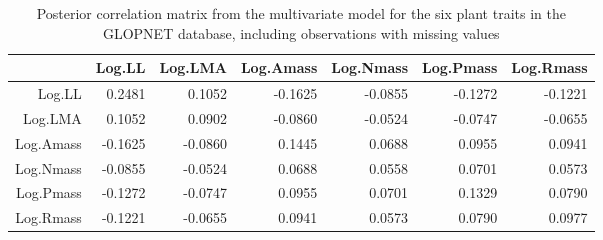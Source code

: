 \documentclass[12pt,fleqn]{article}
\begin{document}
\begin{table}[ht]
\centering
\caption{Posterior correlation matrix from the multivariate model for the six plant traits in the GLOPNET database, including observations with missing values}
\begin{tabular}{rrrrrrr}
  \hline
 & Log.LL & Log.LMA & Log.Amass & Log.Nmass & Log.Pmass & Log.Rmass \\ 
  \hline
Log.LL & 0.2481 & 0.1052 & -0.1625 & -0.0855 & -0.1272 & -0.1221 \\ 
  Log.LMA & 0.1052 & 0.0902 & -0.0860 & -0.0524 & -0.0747 & -0.0655 \\ 
  Log.Amass & -0.1625 & -0.0860 & 0.1445 & 0.0688 & 0.0955 & 0.0941 \\ 
  Log.Nmass & -0.0855 & -0.0524 & 0.0688 & 0.0558 & 0.0701 & 0.0573 \\ 
  Log.Pmass & -0.1272 & -0.0747 & 0.0955 & 0.0701 & 0.1329 & 0.0790 \\ 
  Log.Rmass & -0.1221 & -0.0655 & 0.0941 & 0.0573 & 0.0790 & 0.0977 \\ 
   \hline
\end{tabular}
\end{table}
\end{document}
